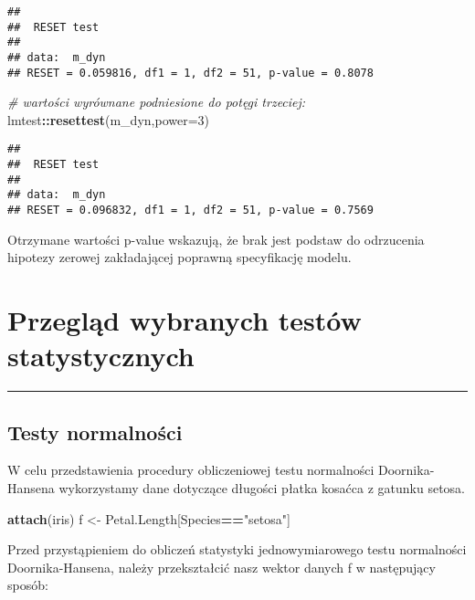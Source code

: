 \documentclass[polish,]{book}
\newenvironment{Shaded}{\begin{snugshade}}{\end{snugshade}}
\newcommand{\CommentTok}[1]{\textcolor[rgb]{0.56,0.35,0.01}{\textit{#1}}}
\newcommand{\DataTypeTok}[1]{\textcolor[rgb]{0.13,0.29,0.53}{#1}}
\newcommand{\DecValTok}[1]{\textcolor[rgb]{0.00,0.00,0.81}{#1}}
\newcommand{\KeywordTok}[1]{\textcolor[rgb]{0.13,0.29,0.53}{\textbf{#1}}}
\newcommand{\NormalTok}[1]{#1}
\newcommand{\OperatorTok}[1]{\textcolor[rgb]{0.81,0.36,0.00}{\textbf{#1}}}
\newcommand{\StringTok}[1]{\textcolor[rgb]{0.31,0.60,0.02}{#1}}
\begin{document}
\begin{verbatim}
## 
##  RESET test
## 
## data:  m_dyn
## RESET = 0.059816, df1 = 1, df2 = 51, p-value = 0.8078
\end{verbatim}

\begin{Shaded}
\begin{Highlighting}[]
\CommentTok{# wartości wyrównane podniesione do potęgi trzeciej:}
\NormalTok{lmtest}\OperatorTok{::}\KeywordTok{resettest}\NormalTok{(m_dyn,}\DataTypeTok{power=}\DecValTok{3}\NormalTok{)}
\end{Highlighting}
\end{Shaded}

\begin{verbatim}
## 
##  RESET test
## 
## data:  m_dyn
## RESET = 0.096832, df1 = 1, df2 = 51, p-value = 0.7569
\end{verbatim}

Otrzymane wartości p-value wskazują, że brak jest podstaw do odrzucenia hipotezy
zerowej zakładającej poprawną specyfikację modelu.

\hypertarget{part_11}{%
\chapter{Przegląd wybranych testów statystycznych}\label{part_11}}

\begin{center}\rule{0.5\linewidth}{\linethickness}\end{center}

\hypertarget{part_11.1}{%
\section{Testy normalności}\label{part_11.1}}

W celu przedstawienia procedury obliczeniowej testu normalności Doornika-Hansena
wykorzystamy dane dotyczące długości płatka kosaćca z gatunku setosa.

\begin{Shaded}
\begin{Highlighting}[]
\KeywordTok{attach}\NormalTok{(iris)}
\NormalTok{f <-}\StringTok{  }\NormalTok{Petal.Length[Species}\OperatorTok{==}\StringTok{"setosa"}\NormalTok{]}
\end{Highlighting}
\end{Shaded}

Przed przystąpieniem do obliczeń statystyki jednowymiarowego testu normalności Doornika-Hansena, należy przekształcić nasz wektor danych f w następujący
sposób:
\end{document}
